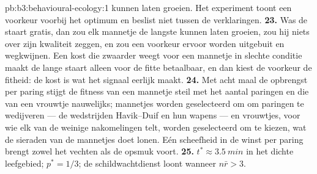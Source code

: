 \begin{solution}{pb:b3:behavioural-ecology:1}
kunnen laten groeien. Het experiment toont een voorkeur voorbij het
optimum en beslist niet tussen de verklaringen.
\textbf{23.} Was de staart gratis, dan zou elk mannetje de langste
kunnen laten groeien, zou hij niets over zijn kwaliteit zeggen, en zou
een voorkeur ervoor worden uitgebuit en wegkwijnen. Een kost die
zwaarder weegt voor een mannetje in slechte conditie maakt de lange
staart alleen voor de fitte betaalbaar, en dan kiest de voorkeur de
fitheid: de kost is wat het signaal eerlijk maakt.
\textbf{24.} Met acht maal de opbrengst per paring stijgt de fitness van
een mannetje steil met het aantal paringen en die van een vrouwtje
nauwelijks; mannetjes worden geselecteerd om om paringen te wedijveren
--- de wedstrijden Havik--Duif en hun wapens --- en vrouwtjes, voor wie
elk van de weinige nakomelingen telt, worden geselecteerd om te kiezen,
wat de sieraden van de mannetjes doet lonen. Eén scheefheid in de winst
per paring brengt zowel het vechten als de opsmuk voort.
\textbf{25.} $t^{*} \approx \qty{3.5}{min}$ in het dichte leefgebied; $p^{*}
= 1/3$; de schildwachtdienst loont wanneer $n\bar r > 3$.
\end{solution}
